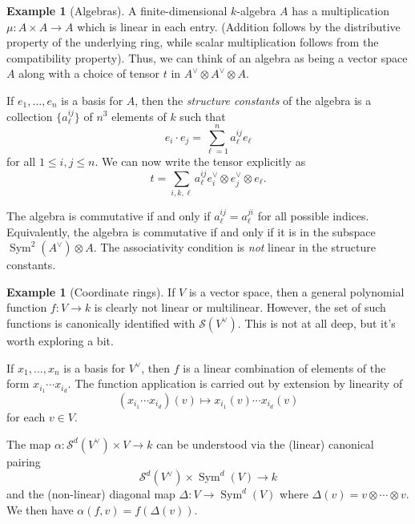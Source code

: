 \documentclass[12pt]{article}
\theoremstyle{plain}
\theoremstyle{definition}
\newtheorem{example}[theorem]{Example}
\theoremstyle{remark}
\numberwithin{equation}{section}
\begin{document}
\begin{example}[Algebras]
A finite-dimensional $k$-algebra $A$ has a multiplication $\mu: A \times
A \to A$ which is linear in each entry.
(Addition follows by the distributive property of the underlying ring,
while scalar multiplication follows from the compatibility property).
Thus, we can think of an algebra as being a vector space $A$
along with a choice of tensor $t$ in $A^\vee \otimes A^\vee \otimes A$.

If $e_1,\ldots,e_n$ is a basis for $A$,
then the \emph{structure constants} of the algebra
is a collection $\{ a^{ij}_\ell\}$ of $n^3$ elements of $k$ such that
\[
e_i\cdot e_j = \sum_{\ell=1}^n a^{ij}_\ell e_\ell
\]
for all $1 \le i,j \le n$.
We can now write the tensor explicitly as
\[
t = \sum_{i,k,\ell} a^{ij}_\ell e_i^\vee \otimes e_j^\vee \otimes
e_\ell.
\]

The algebra is commutative if and only if $a^{ij}_\ell=a^{ji}_\ell$
for all possible indices.  Equivalently, the algebra is commutative if
and only if it is in the subspace $\operatorname{Sym}^2(A^\vee) \otimes A$.
The associativity condition is \emph{not} linear in the structure
constants. 
\end{example}

\begin{example}[Coordinate rings]
If $V$ is a vector space, then a general polynomial function $f: V \to k$
is clearly not linear or multilinear.  However, the set of such
functions is canonically identified with $\mathcal{S}(V^\vee)$.
This is not at all deep, but it's worth exploring a bit.

If $x_1,\ldots,x_n$ is a basis for $V^\vee$, then
$f$ is a linear combination of elements of the form
$x_{i_1}\cdots x_{i_d}$.  The function application is carried out
by extension by linearity of
\[
(x_{i_1}\cdots x_{i_d})(v) \mapsto x_{i_1}(v)\cdots x_{i_d}(v)
\]
for each $v \in V$.

The map $\alpha : \mathcal{S}^d(V^\vee) \times V \to k$
can be understood via the (linear) canonical pairing
\[
\mathcal{S}^d(V^\vee) \times \operatorname{Sym}^d(V) \to k
\]
and the (non-linear)
diagonal map $\Delta: V \to \operatorname{Sym}^d(V)$
where $\Delta(v) = v \otimes \cdots \otimes v$.
We then have $\alpha(f,v) = f(\Delta(v))$.
\end{example}
\end{document}
